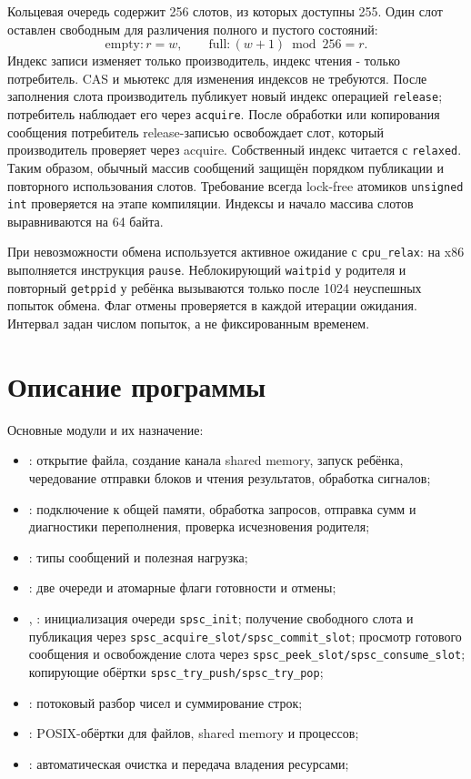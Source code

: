\documentclass[12pt,a4paper,oneside,fleqn]{article}
\begin{document}
Кольцевая очередь содержит 256 слотов, из которых доступны 255. Один слот
оставлен свободным для различения полного и пустого состояний:
\[
  \text{empty}: r=w,\qquad
  \text{full}: (w+1)\bmod256=r.
\]
Индекс записи изменяет только производитель, индекс чтения - только потребитель.
CAS и мьютекс для изменения индексов не требуются. После заполнения слота
производитель публикует новый индекс операцией \texttt{release}; потребитель
наблюдает его через \texttt{acquire}. После обработки или копирования сообщения потребитель
release-записью освобождает слот, который производитель проверяет через acquire.
Собственный индекс читается с \texttt{relaxed}. Таким образом, обычный массив
сообщений защищён порядком публикации и повторного использования слотов.
Требование всегда lock-free атомиков \texttt{unsigned int} проверяется
на этапе компиляции. Индексы и начало массива слотов выравниваются на 64 байта.

При невозможности обмена используется активное ожидание с \texttt{cpu\_relax}:
на x86 выполняется инструкция \texttt{pause}. Неблокирующий \texttt{waitpid}
у родителя и повторный \texttt{getppid} у ребёнка вызываются только после
1024 неуспешных попыток обмена. Флаг отмены проверяется в каждой итерации
ожидания. Интервал задан числом попыток, а не фиксированным временем.

\section{Описание программы}
Основные модули и их назначение:
\begin{itemize}
\item {}: открытие файла, создание канала shared memory, запуск ребёнка,
чередование отправки блоков и чтения результатов, обработка сигналов;
\item {}: подключение к общей памяти, обработка запросов, отправка сумм
и диагностики переполнения, проверка исчезновения родителя;
\item {}: типы сообщений и полезная нагрузка;
\item {}: две очереди и атомарные флаги готовности и отмены;
\item {}, : инициализация очереди
\texttt{spsc\_init}; получение свободного слота и публикация через
\texttt{spsc\_acquire\_slot/spsc\_commit\_slot}; просмотр готового сообщения и
освобождение слота через \texttt{spsc\_peek\_slot/spsc\_consume\_slot};
копирующие обёртки \texttt{spsc\_try\_push/spsc\_try\_pop};
\item {}: потоковый разбор чисел и суммирование строк;
\item {}: POSIX-обёртки для файлов, shared memory и процессов;
\item {}: автоматическая очистка и передача владения ресурсами;
\end{itemize}
\end{document}
